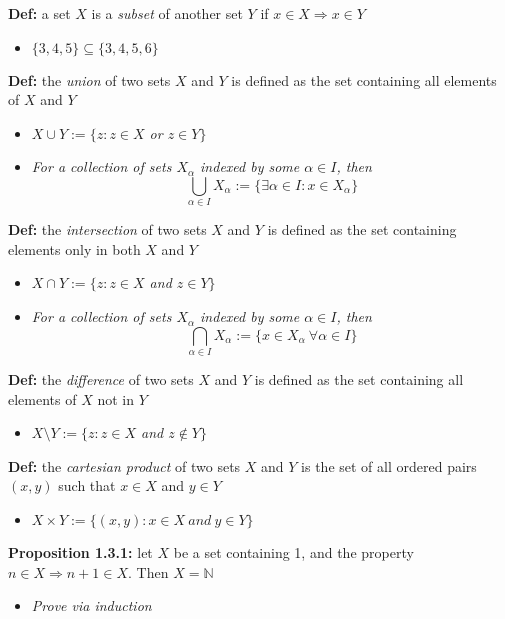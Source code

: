 \documentclass[12pt]{article}
\begin{document}
\textbf{Def: }a set $X$ is a \emph{subset} of another set $Y$ if $x \in X \Rightarrow x \in Y$
\begin{itemize}
    \item \emph{$\{ 3, 4, 5\} \subseteq \{ 3, 4, 5, 6\}$}
\end{itemize}

\textbf{Def: }the \emph{union} of two sets $X$ and $Y$ is defined as the set containing all elements of $X$ and $Y$
\begin{itemize}
    \item \emph{$X \cup Y := \{ z : z \in X$ or $z \in Y\}$}
    \item \emph{For a collection of sets $X_{\alpha}$ indexed by some $\alpha \in I$, then $$\bigcup_{\alpha \in I} X_{\alpha} := \{ \exists \alpha \in I : x \in X_{\alpha} \}$$}
\end{itemize}

\textbf{Def: }the \emph{intersection} of two sets $X$ and $Y$ is defined as the set containing elements only in both $X$ and $Y$
\begin{itemize}
    \item \emph{$X \cap Y := \{ z : z \in X$ and $z \in Y\}$}
    \item \emph{For a collection of sets $X_{\alpha}$ indexed by some $\alpha \in I$, then $$\bigcap_{\alpha \in I} X_{\alpha} := \{ x \in X_{\alpha}\ \forall \alpha \in I \}$$}
\end{itemize}

\textbf{Def: }the \emph{difference} of two sets $X$ and $Y$ is defined as the set containing all elements of $X$ not in $Y$
\begin{itemize}
    \item \emph{$X \setminus Y := \{ z : z \in X$ and $z \notin Y\}$}
\end{itemize}

\textbf{Def: }the \emph{cartesian product} of two sets $X$ and $Y$ is the set of all ordered pairs $(x, y)$ such that $x \in X$ and $y \in Y$
\begin{itemize}
    \item $X \times Y := \{ (x, y) : x \in X\ and\ y \in Y\}$
\end{itemize}

\textbf{Proposition 1.3.1: }let $X$ be a set containing 1, and the property $n \in X \Rightarrow n + 1 \in X$. Then $X = \mathbb{N}$
\begin{itemize}
    \item 
    \emph{Prove via induction}
\end{itemize}
\end{document}

